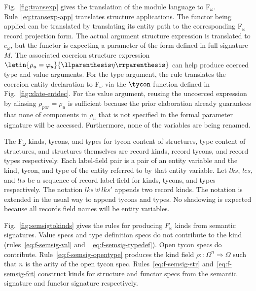 Fig.~\ref{fig:transexp} gives the translation of the module
language to F$_\omega$. Rule~\ref{eq:transexp-app} translates
structure applications. The functor being applied can be translated by
translating its entity path to the corresponding F$_\omega$ record
projection form. The actual argument structure expression is
translated to $e_\omega$, but the functor is expecting a parameter of
the form defined in full signature $M$. The associated coercion
structure expression $\letin{\rho_u=\varphi_u}{\llparenthesis \eta
  \rrparenthesis}$ can help produce coerced type and value
arguments. For the type argument, the rule translates the coercion entity
declaration to F$_\omega$ via the $\tycon$ function defined in
Fig.~\ref{fig:xlate-entdec}. For the value argument, reusing the
uncoerced expression by aliasing $\rho_{par} = \rho_u$ is sufficient
because the prior elaboration already guarantees that none of
components in $\rho_u$ that is not specified in the formal parameter
signature will be accessed. Furthermore, none of the variables are
being renamed. 
   


The F$_\omega$ kinds, tycons, and types for tycon content of structures, type
content of structures, and structures themselves are record kinds,
record tycons, and record types respectively. Each label-field pair is
a pair of an entity variable and the kind, tycon, and type of the
entity referred to by that entity variable. Let $lks$, $lcs$, and $lts$ be a sequence of record label-field for
kinds, tycons, and types respectively. The notation
$lks\uplus lks'$ appends two record kinds. The notation is extended in
the usual way to append tycons and types. No shadowing is expected
because all records field names will be entity variables. 

Fig.~\ref{fig:semsigtokinds} gives the rules for producing $F_\omega$
kinds from semantic signatures. Value specs and type definition specs
do not contribute to the kind (rules~\ref{eq:f-semsig-val} and~
\ref{eq:f-semsig-typedef}). Open tycon specs do
contribute. Rule~\ref{eq:f-semsig-opentype} produces the kind field
$\rho::\Omega^n \Rightarrow \Omega$ such that $n$ is the arity of the
open tycon spec. Rules~\ref{eq:f-semsig-str} and~\ref{eq:f-semsig-fct}
construct kinds for structure and functor specs from the semantic
signature and functor signature respectively. 

